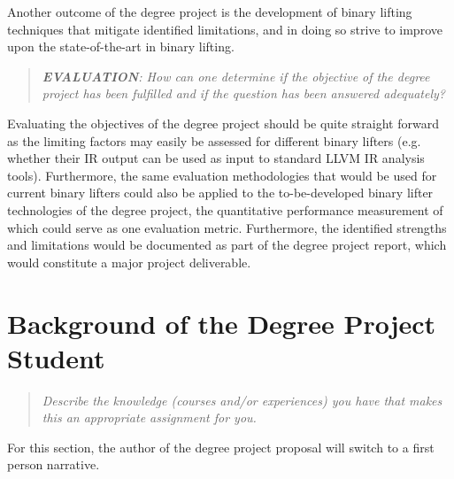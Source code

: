 \documentclass[12pt, a4paper]{article}
\begin{document}
Another outcome of the degree project is the development of binary lifting techniques that mitigate identified limitations, and in doing so strive to improve upon the state-of-the-art in binary lifting.

\begin{quote}
	\textit{\textbf{EVALUATION}: How can one determine if the objective of the degree project has been fulfilled and if the question has been answered adequately?}
\end{quote}

Evaluating the objectives of the degree project should be quite straight forward as the limiting factors may easily be assessed for different binary lifters (e.g. whether their IR output can be used as input to standard LLVM IR analysis tools). Furthermore, the same evaluation methodologies that would be used for current binary lifters could also be applied to the to-be-developed binary lifter technologies of the degree project, the quantitative performance measurement of which could serve as one evaluation metric. Furthermore, the identified strengths and limitations would be documented as part of the degree project report, which would constitute a major project deliverable.

\section{Background of the Degree Project Student}

\begin{quote}
	\textit{\textit{Describe the knowledge (courses and/or experiences) you have that makes this an appropriate assignment for you.}}
\end{quote}

For this section, the author of the degree project proposal will switch to a first person narrative.
\end{document}
